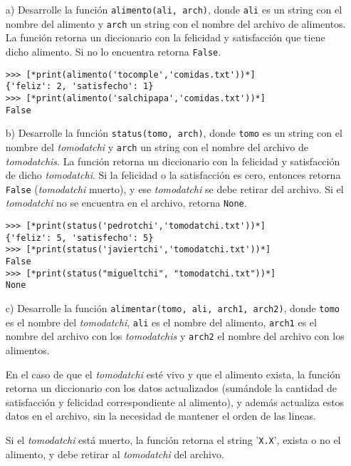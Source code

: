 \begin{enumerate}
    \item[a)] Desarrolle la función \texttt{alimento(ali, arch)}, donde \texttt{ali} es un string con el nombre del alimento y \texttt{arch} un string con el nombre del archivo de alimentos. La función retorna un diccionario con la felicidad y satisfacción que tiene dicho alimento. Si no lo encuentra retorna \texttt{False}.

    \begin{lstlisting}[style=consola]
>>> [*print(alimento('tocomple','comidas.txt'))*]
{'feliz': 2, 'satisfecho': 1}
>>> [*print(alimento('salchipapa','comidas.txt'))*]
False
    \end{lstlisting}

    \item[b)] Desarrolle la función \texttt{status(tomo, arch)}, donde \texttt{tomo} es un string con el nombre del \textit{tomodatchi} y \texttt{arch} un string con el nombre del archivo de \textit{tomodatchis}. La función retorna un diccionario con la felicidad y satisfacción de dicho \textit{tomodatchi}. Si la felicidad o la satisfacción es cero, entonces retorna \texttt{False} (\textit{tomodatchi} muerto), y ese \textit{tomodatchi} se debe retirar del archivo. Si el \textit{tomodatchi} no se encuentra en el archivo, retorna \texttt{None}.

    \begin{lstlisting}[style=consola]
>>> [*print(status('pedrotchi','tomodatchi.txt'))*]
{'feliz': 5, 'satisfecho': 5}
>>> [*print(status('javiertchi','tomodatchi.txt'))*]
False
>>> [*print(status("migueltchi", "tomodatchi.txt"))*]
None
    \end{lstlisting}
    
    \item[c)] Desarrolle la función \texttt{alimentar(tomo, ali, arch1, arch2)}, donde \texttt{tomo} es el nombre del \textit{tomodatchi}, \texttt{ali} es el nombre del alimento, \texttt{arch1} es el nombre del archivo con los \textit{tomodatchis} y \texttt{arch2} el nombre del archivo con los alimentos. 
    
    En el caso de que el \textit{tomodatchi} esté vivo y que el alimento exista, la función retorna un diccionario con los datos actualizados (sumándole la cantidad de satisfacción y felicidad correspondiente al alimento), y además actualiza estos datos en el archivo, sin la necesidad de mantener el orden de las lineas. 
    
    Si el \textit{tomodatchi} está muerto, la función retorna el string '\texttt{X.X}', exista o no el alimento, y debe retirar al \textit{tomodatchi} del archivo. 
    

\end{enumerate}
